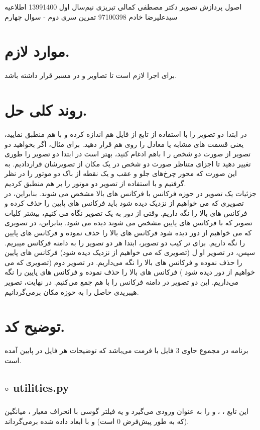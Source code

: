 \documentclass[a4paper,12pt]{article}
\begin{document}
\handout
{اصول پردازش تصویر}
{دکتر مصطفی کمالی تبریزی}
{نیم‌سال اول 1399\lr{-}1400}
{اطلاعیه}
{سیدعلیرضا خادم}
{97100398}
{تمرین سری دوم - سوال چهارم}
\section*{موارد لازم.}
برای اجرا لازم است تا تصاویر
و
در مسیر
قرار داشته باشد.
\section*{روند کلی حل.}
در ابتدا دو تصویر را با استفاده از تابع 
از فایل
هم اندازه کرده و با هم منطبق نمایید، یعنی قسمت های مشابه یا
معادل را روی هم قرار دهید. برای مثال، اگر بخواهید دو تصویر از صورت دو شخص ر ا باهم ادغام کنید، بهتر
است در ابتدا دو تصویر را طوری تغییر دهید تا اجزای متناظر صورت دو شخص در یک مکان از تصویرشان قراردادیم. به این صورت که محور چرخ‌های جلو و عقب و یک نقطه از باک دو موتور را در نظر گرفتیم و با استفاده از 
تصویر دو موتور را بر هم منطبق کردیم.\\
جزئیات یک تصویر در حوزه
فرکانس با فرکانس های بالا مشخص می شوند. بنابراین، در تصویری که می خواهیم از نزدیک دیده شود باید فرکانس
های پایین را حذف کرده و فرکانس های بالا را نگه داریم. وقتی از دور به یک تصویر نگاه می کنیم، بیشتر کلیات
تصویر که با فرکانس های پایین مشخص می شوند دیده می شود. بنابراین، در تصویری که می خواهیم از دور دیده
شود فرکانس های بالا را حذف نموده و فرکانس های پایین را نگه داریم. برای تر کیب دو تصویر، ابتدا هر دو تصویر
را به دامنه فرکانس میبریم. سپس، در تصویر او ل (تصویری که می خواهیم از نزدیک دیده شود) فرکانس های پایین
را حذف نموده و فرکانس های بالا را نگه می‌داریم. در تصویر دوم (تصویری که می خواهیم از دور دیده شود ) فرکانس
های بالا را حذف نموده و فرکانس های پایین را نگه می‌داریم. این دو تصویر در دامنه فرکانس را با هم جمع می‌کنیم. در نهایت، تصویر هیبریدی حاصل را به حوزه مکان برمی‌گردانیم.
\section*{توضیح کد.}
برنامه در مجموع حاوی 3 فایل با فرمت
می‌باشد که توضیحات هر فایل در پایین آمده است.
\subsection*{$\circ$ utilities.py}
\subsubsection*{}
این تابع 
،
،
و
را به عنوان ورودی می‌گیرد و یه فیلتر گوسی با انحراف معیار
  ، میانگین
 (که به طور پیش‌فرض 0 است) و با ابعاد داده شده بر‌می‌گرداند.
\end{document}
